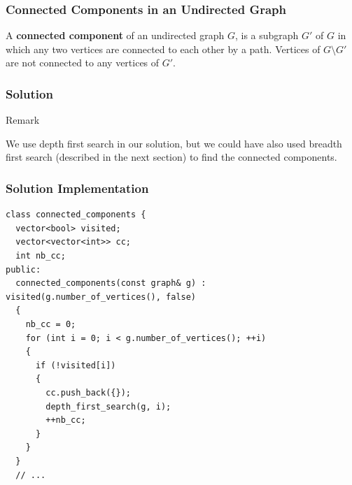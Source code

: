\documentclass{beamer}
\newcommand{\info}[1]{
\begin{bclogo}[arrondi=0.1, logo=\bcinfo]{Remark}
#1
\end{bclogo}
}
\newcounter{exo}
\newcommand{\exo}{
  \addtocounter{exo}{1}
  Exercice \arabic{exo}
}
\begin{document}
\begin{frame}%
\frametitle{Connected Components in an Undirected Graph}

\begin{block}{}
A \textbf{connected component} of an undirected graph $G$, is a subgraph $G'$ of $G$ in which any two vertices are connected to each
other by a path. Vertices of $G \setminus G'$ are not connected to any vertices of $G'$.
\end{block}


\end{frame}


\ifanswers

\begin{frame}%
\frametitle{Solution}

\info{
We use depth first search in our solution, but we could have also used breadth first search (described in the next section)
to find the connected components.
}

\end{frame}


\begin{frame}[containsverbatim]
\frametitle{Solution Implementation}

\scriptsize
\begin{lstlisting}
class connected_components {
  vector<bool> visited;
  vector<vector<int>> cc;
  int nb_cc;
public:
  connected_components(const graph& g) : visited(g.number_of_vertices(), false)
  {
    nb_cc = 0;
    for (int i = 0; i < g.number_of_vertices(); ++i)
    {
      if (!visited[i])
      {
        cc.push_back({});
        depth_first_search(g, i);
        ++nb_cc;
      }
    }
  }
  // ...
\end{lstlisting}

\end{frame}
\end{document}

